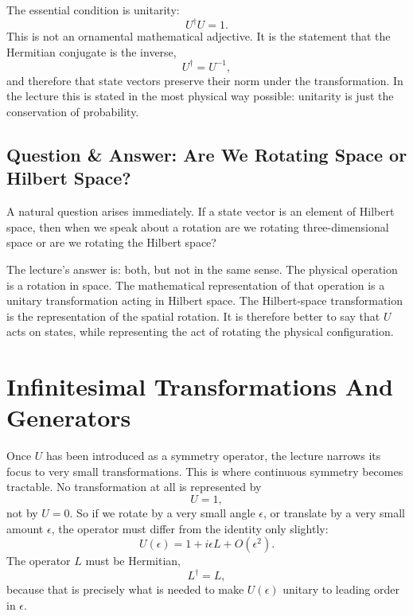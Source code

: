 The essential condition is unitarity:
\begin{equation}
U^\dagger U = 1.
\end{equation}
This is not an ornamental mathematical adjective. It is the statement that the Hermitian conjugate is the inverse,
\begin{equation}
U^\dagger = U^{-1},
\end{equation}
and therefore that state vectors preserve their norm under the transformation. In the lecture this is stated in the most physical way possible: unitarity is just the conservation of probability.

\subsection{Question \& Answer: Are We Rotating Space or Hilbert Space?}

A natural question arises immediately. If a state vector is an element of Hilbert space, then when we speak about a rotation are we rotating three-dimensional space or are we rotating the Hilbert space?

The lecture's answer is: both, but not in the same sense. The physical operation is a rotation in space. The mathematical representation of that operation is a unitary transformation acting in Hilbert space. The Hilbert-space transformation is the representation of the spatial rotation. It is therefore better to say that \(U\) acts on states, while representing the act of rotating the physical configuration.

\section{Infinitesimal Transformations And Generators}

Once \(U\) has been introduced as a symmetry operator, the lecture narrows its focus to very small transformations. This is where continuous symmetry becomes tractable. No transformation at all is represented by
\begin{equation}
U=1,
\end{equation}
not by \(U=0\). So if we rotate by a very small angle \(\epsilon\), or translate by a very small amount \(\epsilon\), the operator must differ from the identity only slightly:
\begin{equation}
U(\epsilon)=1+i\epsilon L+O(\epsilon^2).
\end{equation}
The operator \(L\) must be Hermitian,
\begin{equation}
L^\dagger=L,
\end{equation}
because that is precisely what is needed to make \(U(\epsilon)\) unitary to leading order in \(\epsilon\).

